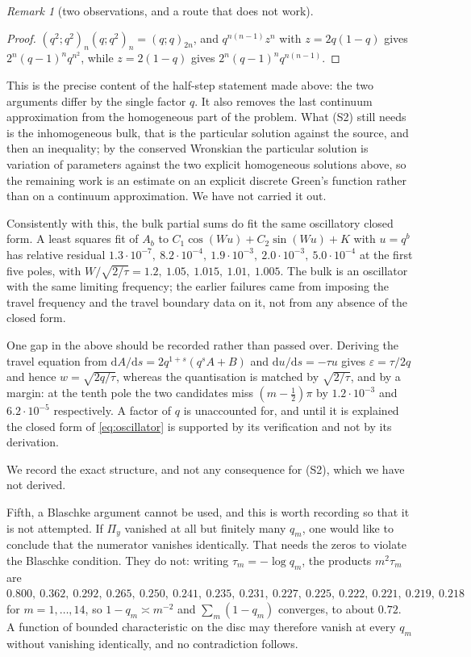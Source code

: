 \documentclass[11pt]{article}
\theoremstyle{definition}
\theoremstyle{remark}
\newtheorem{remark}[theorem]{Remark}
\theoremstyle{definition}
\begin{document}
\begin{remark}[two observations, and a route that does not work]
\begin{proof}
$(q^2;q^2)_n(q;q^2)_n=(q;q)_{2n}$, and $q^{n(n-1)}z^n$ with $z=2q(1-q)$ gives
$2^n(q-1)^nq^{n^2}$, while $z=2(1-q)$ gives $2^n(q-1)^nq^{n(n-1)}$.
\end{proof}

This is the precise content of the half-step statement made above: the two arguments differ by the
single factor $q$. It also removes the last continuum approximation from the homogeneous part of
the problem. What \textup{(S2)} still needs is the inhomogeneous bulk, that is the particular
solution against the source, and then an inequality; by the conserved Wronskian the particular
solution is variation of parameters against the two explicit homogeneous solutions above, so the
remaining work is an estimate on an explicit discrete Green's function rather than on a continuum
approximation. We have not carried it out.

Consistently with this, the bulk partial sums do fit the same oscillatory closed form. A least
squares fit of $A_b$ to $C_1\cos(Wu)+C_2\sin(Wu)+K$ with $u=q^b$ has relative residual
$1.3\cdot10^{-7},\ 8.2\cdot10^{-4},\ 1.9\cdot10^{-3},\ 2.0\cdot10^{-3},\ 5.0\cdot10^{-4}$ at
the first five poles, with $W/\sqrt{2/\tau}=1.2,\ 1.05,\ 1.015,\ 1.01,\ 1.005$. The bulk is an
oscillator with the same limiting frequency; the earlier failures came from imposing the travel
frequency and the travel boundary data on it, not from any absence of the closed form.

One gap in the above should be recorded rather than passed over. Deriving the travel equation from
$\mathrm{d}A/\mathrm{d}s=2q^{1+s}(q^sA+B)$ and $\mathrm{d}u/\mathrm{d}s=-\tau u$ gives
$\varepsilon=\tau/2q$ and hence $w=\sqrt{2q/\tau}$, whereas the quantisation is matched by
$\sqrt{2/\tau}$, and by a margin: at the tenth pole the two candidates miss $(m-\tfrac12)\pi$ by
$1.2\cdot10^{-3}$ and $6.2\cdot10^{-5}$ respectively. A factor of $q$ is unaccounted for, and
until it is explained the closed form of \eqref{eq:oscillator} is supported by its verification
and not by its derivation.

We record the exact structure, and not any consequence for \textup{(S2)}, which we have not
derived.

Fifth, a Blaschke argument cannot be used, and this is worth recording so that it is not
attempted. If $\Pi_y$ vanished at all but finitely many $q_m$, one would like to conclude that
the numerator vanishes identically. That needs the zeros to violate the Blaschke condition. They
do not: writing $\tau_m=-\log q_m$, the products $m^2\tau_m$ are
$0.800,\ 0.362,\ 0.292,\ 0.265,\ 0.250,\ 0.241,\ 0.235,\ 0.231,\ 0.227,\ 0.225,\ 0.222,\
0.221,\ 0.219,\ 0.218$ for $m=1,\dots,14$, so $1-q_m\asymp m^{-2}$ and
$\sum_m(1-q_m)$ converges, to about $0.72$. A function of bounded characteristic on the disc may
therefore vanish at every $q_m$ without vanishing identically, and no contradiction follows.
\end{remark}
\end{document}
